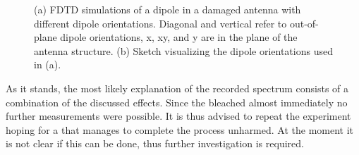 \begin{figure}[htbp]
\begin{subfigure}[t]{ 0.29\linewidth}
						\caption{}
						\label{subfig::dipole_damaged_antenna_sketch}
					\end{subfigure}
					\caption[FDTD simulation of a damaged antenna]{(a) FDTD simulations of a dipole in a damaged antenna with different dipole orientations. Diagonal and vertical refer to out-of-plane dipole orientations, x, xy, and y are in the plane of the antenna structure. (b) Sketch visualizing the dipole orientations used in (a).}
					\label{fig::dipole_damaged_antenna}
				\end{figure}
				As it stands, the most likely explanation of the recorded spectrum consists of a combination of the discussed effects. Since the \nd bleached almost immediately no further measurements were possible. It is thus advised to repeat the experiment hoping for a \nd that manages to complete the \pp process unharmed. At the moment it is not clear if this can be done, thus further investigation is required.


